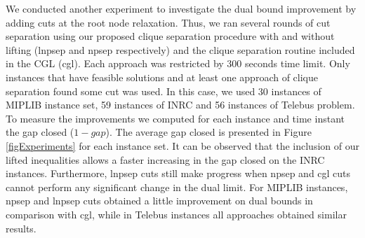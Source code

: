 \documentclass{endm}
\begin{document}
We conducted another experiment to investigate the dual bound improvement by adding cuts at the root node relaxation. Thus, we ran several rounds of cut separation using our proposed clique separation procedure with and without lifting (lnpsep and npsep respectively) and the clique separation routine included in the CGL (cgl). Each approach was restricted by 300 seconds time limit. Only instances that have feasible solutions and at least one approach of clique separation found some cut was used. In this case, we used 30 instances of MIPLIB instance set, 59 instances of INRC and 56 instances of Telebus problem. To measure the improvements we computed for each instance and time instant the gap closed ($1 - gap$). The average gap closed is presented in Figure \ref{figExperiments} for each instance set. It can be observed that the inclusion of our lifted inequalities allows a faster increasing in the gap closed on the INRC instances. Furthermore, lnpsep cuts still make progress when npsep and cgl cuts cannot perform any significant change in the dual limit. For MIPLIB instances, npsep and lnpsep cuts obtained a little improvement on dual bounds in comparison with cgl, while in Telebus instances all approaches obtained similar results.
\end{document}
